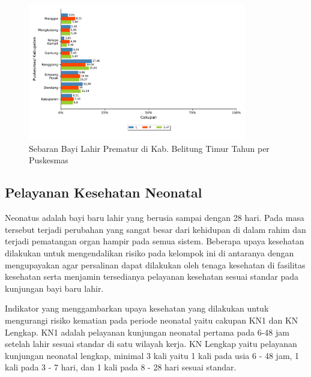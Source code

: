 \begin{figure}[H]
	\centering
	\includegraphics[width=0.85\textwidth]{bab_05/bab_05_13a_Prematur}
	\caption{Sebaran Bayi Lahir Prematur di Kab. Belitung Timur Tahun \tP per Puskesmas}
	\label{fig:Distribusi-Prematur}
\end{figure}

\subsection{Pelayanan Kesehatan Neonatal}
Neonatus adalah bayi baru lahir yang berusia sampai dengan 28 hari.
Pada masa tersebut terjadi perubahan yang sangat besar dari kehidupan
di dalam rahim dan terjadi pematangan organ hampir pada semua sistem.
Beberapa upaya kesehatan dilakukan untuk mengendalikan risiko pada
kelompok ini di antaranya dengan mengupayakan agar persalinan dapat
dilakukan oleh tenaga kesehatan di fasilitas kesehatan serta menjamin
tersedianya pelayanan kesehatan sesuai standar pada kunjungan bayi
baru lahir.

Indikator yang menggambarkan upaya kesehatan yang dilakukan untuk
mengurangi risiko kematian pada periode neonatal yaitu cakupan KN1
dan KN Lengkap. KN1 adalah pelayanan kunjungan neonatal pertama pada
6-48 jam setelah lahir sesuai standar di satu wilayah kerja. KN Lengkap
yaitu pelayanan kunjungan neonatal lengkap, minimal 3 kali yaitu 1
kali pada usia 6 - 48 jam, 1 kali pada 3 - 7 hari, dan 1 kali pada
8 - 28 hari sesuai standar.


